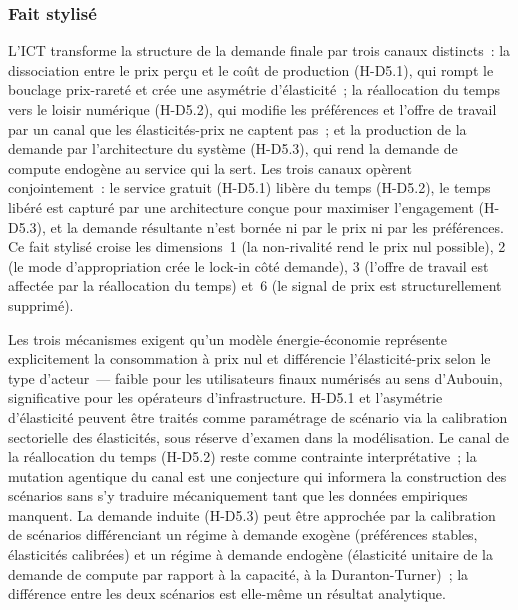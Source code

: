 \subsubsection{Fait stylisé}

L'ICT transforme la structure de la demande finale par trois canaux distincts~: la dissociation entre le prix perçu et le coût de production (H-D5.1), qui rompt le bouclage prix-rareté et crée une asymétrie d'élasticité~; la réallocation du temps vers le loisir numérique (H-D5.2), qui modifie les préférences et l'offre de travail par un canal que les élasticités-prix ne captent pas~; et la production de la demande par l'architecture du système (H-D5.3), qui rend la demande de compute endogène au service qui la sert. Les trois canaux opèrent conjointement~: le service gratuit (H-D5.1) libère du temps (H-D5.2), le temps libéré est capturé par une architecture conçue pour maximiser l'engagement (H-D5.3), et la demande résultante n'est bornée ni par le prix ni par les préférences. Ce fait stylisé croise les dimensions~1 (la non-rivalité rend le prix nul possible), 2 (le mode d'appropriation crée le lock-in côté demande), 3 (l'offre de travail est affectée par la réallocation du temps) et~6 (le signal de prix est structurellement supprimé).

Les trois mécanismes exigent qu'un modèle énergie-économie représente explicitement la consommation à prix nul et différencie l'élasticité-prix selon le type d'acteur~--- faible pour les utilisateurs finaux numérisés au sens d'Aubouin, significative pour les opérateurs d'infrastructure. H-D5.1 et l'asymétrie d'élasticité peuvent être traités comme paramétrage de scénario via la calibration sectorielle des élasticités, sous réserve d'examen dans la modélisation. Le canal de la réallocation du temps (H-D5.2) reste comme contrainte interprétative~; la mutation agentique du canal est une conjecture qui informera la construction des scénarios sans s'y traduire mécaniquement tant que les données empiriques manquent. La demande induite (H-D5.3) peut être approchée par la calibration de scénarios différenciant un régime à demande exogène (préférences stables, élasticités calibrées) et un régime à demande endogène (élasticité unitaire de la demande de compute par rapport à la capacité, à la Duranton-Turner)~; la différence entre les deux scénarios est elle-même un résultat analytique.


